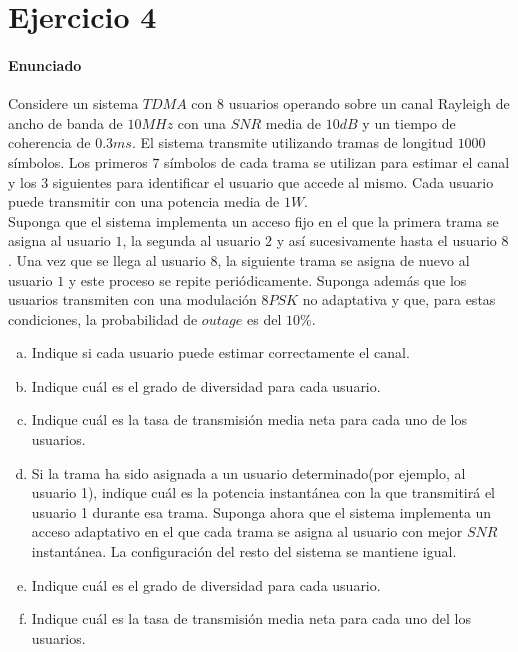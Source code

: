 \documentclass[fleqn,14pt]{article}
\begin{document}
\newpage
\section*{Ejercicio 4}
\paragraph{Enunciado}
Considere un sistema $TDMA$ con $8$ usuarios operando sobre un canal Rayleigh de ancho de banda de $10MHz$ con una $SNR$ media de $10dB$ y un tiempo de coherencia de $0.3ms$. El sistema transmite utilizando tramas de longitud $1000$ s\'imbolos. Los primeros $7$ s\'imbolos de cada trama se utilizan para estimar el canal y los $3$ siguientes para identificar el usuario  que accede al mismo. Cada usuario puede transmitir con una potencia media de $1W$.\\
Suponga que el sistema implementa un acceso fijo en el que la primera trama se asigna al usuario $1$, la segunda al usuario $2$ y as\'i sucesivamente hasta el usuario $8$. Una vez que se llega al usuario $8$, la siguiente trama se asigna de nuevo al usuario $1$ y este proceso se repite peri\'odicamente. Suponga adem\'as que los usuarios transmiten con una modulaci\'on $8PSK$ no adaptativa y que, para estas condiciones, la probabilidad de $outage$ es del $10\%$.
\begin{enumerate}[a)]
  \item Indique si cada usuario puede estimar correctamente el canal.
  \item Indique cu\'al es el grado de diversidad para cada usuario.
  \item Indique cu\'al es la tasa de transmisi\'on media neta para cada uno de los usuarios.
  \item Si la trama ha sido asignada a un usuario determinado(por ejemplo, al usuario 1), indique cu\'al es la potencia instant\'anea con la que transmitir\'a el usuario 1 durante esa trama.
  \newline
  \newline
  Suponga ahora que el sistema implementa un acceso adaptativo en el que cada trama se asigna al usuario con mejor $SNR$ instant\'anea. La configuraci\'on del resto del sistema se mantiene igual.
  \item Indique cu\'al es el grado de diversidad para cada usuario.
  \item Indique cu\'al es la tasa de transmisi\'on media neta para cada uno del los usuarios.
\end{enumerate}
\end{document}
